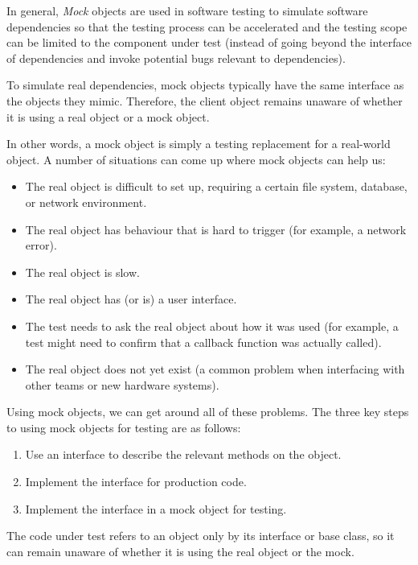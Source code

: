 \documentclass[
  print,
  table,
  nolof,
  nolot,
  nocover,
  oneside
]{fithesis3}
\begin{document}
In general, \textit{Mock} objects are used in software testing to simulate software dependencies so that the testing process can be accelerated and the testing scope can be limited to the component under test (instead of going beyond the interface of dependencies and invoke potential bugs relevant to dependencies).

To simulate real dependencies, mock objects typically have the same interface as the objects they mimic. Therefore, the client object remains unaware of whether it is using a real object or a mock object\parencite{faking_objects}.

In other words, a mock object is simply a testing replacement for a real-world object. A number of situations can come up where mock objects can help us:
\begin{itemize}
    \item The real object is difficult to set up, requiring a certain file system, database, or network environment.
    \item The real object has behaviour that is hard to trigger (for example, a network error).
    \item The real object is slow.
    \item The real object has (or is) a user interface.
    \item The test needs to ask the real object about how it was used (for example, a test might need to confirm that a callback function was actually called).
    \item The real object does not yet exist (a common problem when interfacing with other teams or new hardware systems).
\end{itemize}

Using mock objects, we can get around all of these problems. The three key steps to using mock objects for testing are as follows:
\begin{enumerate}
    \item Use an interface to describe the relevant methods on the object.
    \item Implement the interface for production code.
    \item Implement the interface in a mock object for testing.
\end{enumerate}

The code under test refers to an object only by its interface or base class, so it can remain unaware of whether it is using the real object or the mock\parencite{why_fakes}.

\end{document}
